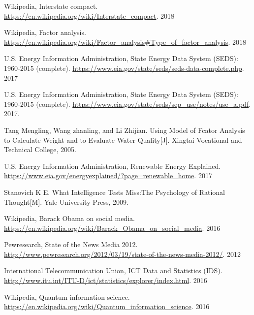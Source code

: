 \documentclass[a4paper,11pt]{article}
\begin{document}
\newpage%
\thispagestyle{empty}%
\begin{thebibliography}{}
%
%
Wikipedia, Interstate compact. \url{https://en.wikipedia.org/wiki/Interstate_compact}. 2018

Wikipedia, Factor analysis. \url{https://en.wikipedia.org/wiki/Factor_analysis#Type_of_factor_analysis}. 2018

U.S. Energy Information Administration, State Energy Data System (SEDS): 1960-2015 (complete). \url{https://www.eia.gov/state/seds/seds-data-complete.php}. 2017

U.S. Energy Information Administration, State Energy Data System (SEDS): 1960-2015 (complete). \url{https://www.eia.gov/state/seds/sep_use/notes/use_a.pdf}. 2017.

Tang Mengling, Wang zhanling, and Li Zhijian. Using Model of Fcator Analysis to Calculate Weight and to Evaluate Water Quality[J]. Xingtai Vocational and Technical College, 2005.

U.S. Energy Information Administration, Renewable Energy Explained. \url{https://www.eia.gov/energyexplained/?page=renewable_home}. 2017



Stanovich K E. What Intelligence Tests Miss:The Psychology of Rational Thought[M]. Yale University Press, 2009.

Wikipedia, Barack Obama on social media. \url{https://en.wikipedia.org/wiki/Barack_Obama_on_social_media}. 2016


Pewresearch, State of the News Media 2012. \url{http://www.pewresearch.org/2012/03/19/state-of-the-news-media-2012/}. 2012

International Telecommunication Union, ICT Data and Statistics (IDS). \url{http://www.itu.int/ITU-D/ict/statistics/explorer/index.html}. 2016

Wikipedia, Quantum information science. \url{https://en.wikipedia.org/wiki/Quantum_information_science}. 2016
\end{thebibliography}
\end{document}
